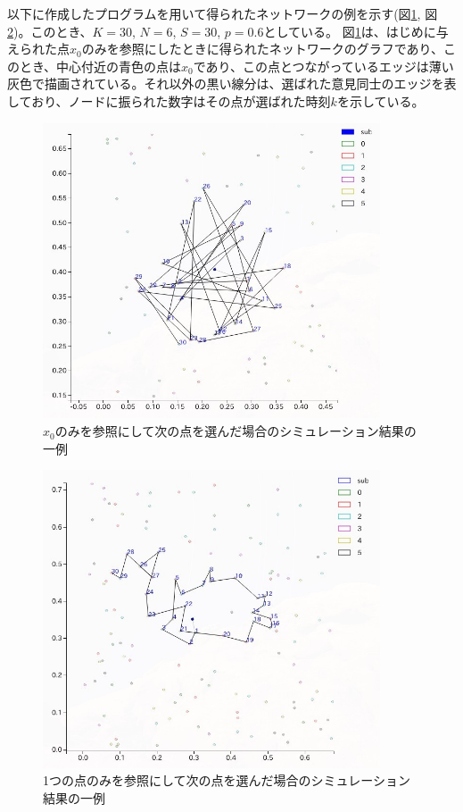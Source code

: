 以下に作成したプログラムを用いて得られたネットワークの例を示す(図\ref{fig:f9}, 図\ref{fig:f10})。このとき、$K=30$, $N=6$, $S=30$, $p=0.6$としている。
図\ref{fig:f9}は、はじめに与えられた点$x_{0}$のみを参照にしたときに得られたネットワークのグラフであり、このとき、中心付近の青色の点は$x_{0}$であり、この点とつながっているエッジは薄い灰色で描画されている。それ以外の黒い線分は、選ばれた意見同士のエッジを表しており、ノードに振られた数字はその点が選ばれた時刻$k$を示している。
\begin{figure}[H]
    \begin{center}
        \includegraphics[width=10cm]{../simple3/case_2.jpg}
        \caption{$x_{0}$のみを参照にして次の点を選んだ場合のシミュレーション結果の一例}
        \label{fig:f9}
    \end{center}
\end{figure}
\begin{figure}[H]
    \begin{center}
        \includegraphics[width=10cm]{../simple3/case_3.jpg}
        \caption{1つの点のみを参照にして次の点を選んだ場合のシミュレーション結果の一例}
        \label{fig:f10}
    \end{center}
\end{figure}
